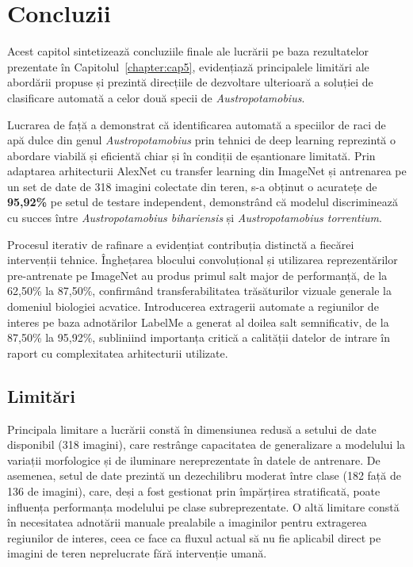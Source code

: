 \chapter{Concluzii}\label{chapter:cap6}

Acest capitol sintetizează concluziile finale ale lucrării pe baza rezultatelor prezentate în Capitolul~\ref{chapter:cap5}, evidențiază principalele limitări ale abordării propuse și prezintă direcțiile de dezvoltare ulterioară a soluției de clasificare automată a celor două specii de \textit{Austropotamobius}.


Lucrarea de față a demonstrat că identificarea automată a speciilor de raci de apă dulce din genul \textit{Austropotamobius} prin tehnici de deep learning reprezintă o abordare viabilă și eficientă chiar și în condiții de eșantionare limitată. Prin adaptarea arhitecturii AlexNet cu transfer learning din ImageNet și antrenarea pe un set de date de 318 imagini colectate din teren, s-a obținut o acuratețe de \textbf{95,92\%} pe setul de testare independent, demonstrând că modelul discriminează cu succes între \textit{Austropotamobius bihariensis} și \textit{Austropotamobius torrentium}.

Procesul iterativ de rafinare a evidențiat contribuția distinctă a fiecărei intervenții tehnice. Înghețarea blocului convoluțional și utilizarea reprezentărilor pre-antrenate pe ImageNet au produs primul salt major de performanță, de la 62,50\% la 87,50\%, confirmând transferabilitatea trăsăturilor vizuale generale la domeniul biologiei acvatice. Introducerea extragerii automate a regiunilor de interes pe baza adnotărilor LabelMe a generat al doilea salt semnificativ, de la 87,50\% la 95,92\%, subliniind importanța critică a calității datelor de intrare în raport cu complexitatea arhitecturii utilizate.

\section*{Limitări}

Principala limitare a lucrării constă în dimensiunea redusă a setului de date disponibil (318 imagini), care restrânge capacitatea de generalizare a modelului la variații morfologice și de iluminare nereprezentate în datele de antrenare. De asemenea, setul de date prezintă un dezechilibru moderat între clase (182 față de 136 de imagini), care, deși a fost gestionat prin împărțirea stratificată, poate influența performanța modelului pe clase subreprezentate. O altă limitare constă în necesitatea adnotării manuale prealabile a imaginilor pentru extragerea regiunilor de interes, ceea ce face ca fluxul actual să nu fie aplicabil direct pe imagini de teren neprelucrate fără intervenție umană.

